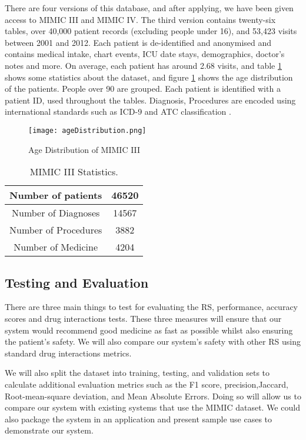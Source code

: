 There are four versions of this database, and after applying, we have been
given access to MIMIC III and MIMIC IV. The third version contains twenty-six
tables, over 40,000 patient records (excluding people under 16), and 53,423
visits between 2001 and 2012. Each patient is de-identified and anonymised and
contains medical intake, chart events, ICU date stays, demographics, doctor's
notes and more. On average, each patient has around 2.68 visits, and table \ref{age}
shows some statistics about the dataset, and figure \ref{statistics} shows the age
distribution of the patients. People over 90 are grouped. Each patient is
identified with a patient ID, used throughout the tables. Diagnosis, Procedures
are encoded using international standards such as ICD-9 and ATC classification .

\begin{figure}[h]
    \texttt{[image: ageDistribution.png]}
    \caption{Age Distribution of MIMIC III}
    \label{age}
\end{figure}


\begin{table}[h]

    \caption{MIMIC III Statistics.}
    \label{statistics}
\begin{center}
\begin{tabular}{ | c | c | }
    \hline
 Number of patients     & 46520 \\ 
    \hline
 Number of Diagnoses    & 14567 \\  
    \hline
 Number of Procedures   & 3882  \\
    \hline
 Number of Medicine     & 4204  \\
    \hline
\end{tabular}
\end{center}

    \end{table}


\subsection{Testing and Evaluation}

There are three main things to test for evaluating the RS, performance,
accuracy scores and drug interactions tests. These three measures will
ensure that our system would recommend good medicine as fast as possible
whilst also ensuring the patient's safety. We will also compare our
system's safety with other RS using standard drug interactions metrics.

We will also split the dataset into training, testing, and validation sets
to calculate additional evaluation metrics such as the F1 score,
precision,Jaccard, Root-mean-square deviation, and Mean Absolute Errors. Doing so
will allow us to compare our system with existing systems that use the
MIMIC dataset. We could also package the system in an application and
present sample use cases to demonstrate our system. 


